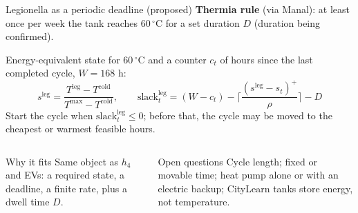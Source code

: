 \documentclass[aspectratio=169,10pt]{beamer}
\begin{document}
\begin{frame}{Legionella as a periodic deadline (proposed)}
\textbf{Thermia rule} (via Manal): at least once per week the tank reaches $60\,^\circ$C for a set duration $D$ (duration being confirmed).
\vspace{0.3em}

Energy-equivalent state for $60\,^\circ$C and a counter $c_t$ of hours since the last completed cycle, $W = 168$ h:
\[
s^{\text{leg}} = \frac{T^{\text{leg}} - T^{\text{cold}}}{T^{\max} - T^{\text{cold}}},
\qquad
\text{slack}^{\text{leg}}_t = (W - c_t) - \Big\lceil \frac{(s^{\text{leg}} - s_t)^+}{\rho} \Big\rceil - D
\]
Start the cycle when $\text{slack}^{\text{leg}}_t \le 0$; before that, the cycle may be moved to the cheapest or warmest feasible hours.
\vspace{0.3em}
\begin{columns}[T]
\begin{block}{Why it fits}
Same object as $h_4$ and EVs: a required state, a deadline, a finite rate, plus a dwell time $D$.
\end{block}
\begin{alertblock}{Open questions}
Cycle length; fixed or movable time; heat pump alone or with an electric backup; CityLearn tanks store energy, not temperature.
\end{alertblock}
\end{columns}
\end{frame}
\end{document}
